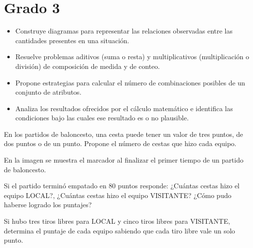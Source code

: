 \section{Grado 3}\label{grado:3}


\evidencias

\begin{itemize}
  \item Construye diagramas para representar las relaciones observadas entre las cantidades presentes en una situación.
  \item Resuelve problemas aditivos (suma o resta) y multiplicativos (multiplicación o división) de composición de medida y de conteo.
  \item Propone estrategias para calcular el número de combinaciones posibles de un conjunto de atributos.
  \item Analiza los resultados ofrecidos por el cálculo matemático e identifica las condiciones bajo las cuales ese resultado es o no plausible.
\end{itemize}

\ejemplo

En los partidos de baloncesto, una cesta puede tener un valor de tres puntos, de dos puntos o de un punto. Propone el número de cestas que hizo cada equipo.


En la imagen se muestra el marcador al finalizar el primer tiempo de un partido de baloncesto.

Si el partido terminó empatado en 80 puntos responde: ¿Cuántas cestas hizo el equipo LOCAL?, ¿Cuántas cestas hizo el equipo VISITANTE? ¿Cómo pudo haberse logrado los puntajes?

Si hubo tres tiros libres para LOCAL y cinco tiros libres para VISITANTE, determina el puntaje de cada equipo sabiendo que cada tiro libre vale un solo punto.


\evidencias

